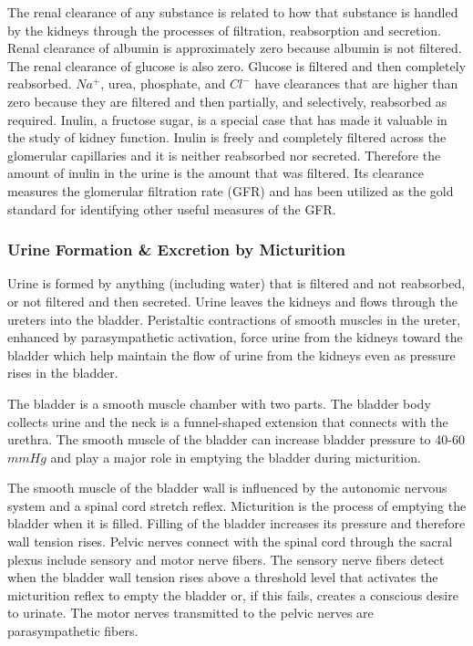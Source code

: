 The renal clearance of any substance is related to how that substance is handled by the kidneys through the processes of filtration, reabsorption and secretion. Renal clearance of albumin is approximately zero because albumin is not filtered. The renal clearance of glucose is also zero. Glucose is filtered and then completely reabsorbed. $Na^+$, urea, phosphate, and $Cl^-$ have clearances that are higher than zero because they are filtered and then partially, and selectively, reabsorbed as required. Inulin, a fructose sugar, is a special case that has made it valuable in the study of kidney function. Inulin is freely and completely filtered across the glomerular capillaries and it is neither reabsorbed nor secreted. Therefore the amount of inulin in the urine is the amount that was filtered. Its clearance measures the glomerular filtration rate (GFR) and has been utilized as the gold standard for identifying other useful measures of the GFR.

\subsubsection{Urine Formation \& Excretion by Micturition}

Urine is formed by anything (including water) that is filtered and not reabsorbed, or not filtered and then secreted. Urine leaves the kidneys and flows through the ureters into the bladder. Peristaltic contractions of smooth muscles in the ureter, enhanced by parasympathetic activation, force urine from the kidneys toward the bladder which help maintain the flow of urine from the kidneys even as pressure rises in the bladder. 

The bladder is a smooth muscle chamber with two parts. The bladder body collects urine and the neck is a funnel-shaped extension that connects with the urethra. The smooth muscle of the bladder can increase bladder pressure to 40-60 $mm Hg$ and play a major role in emptying the bladder during micturition.

The smooth muscle of the bladder wall is influenced by the autonomic nervous system and a spinal cord stretch reflex. Micturition is the process of emptying the bladder when it is filled. Filling of the bladder increases its pressure and therefore wall tension rises. Pelvic nerves connect with the spinal cord through the sacral plexus include sensory and motor nerve fibers. The sensory nerve fibers detect when the bladder wall tension rises above a threshold level that activates the micturition reflex to empty the bladder or, if this fails, creates a conscious desire to urinate. The motor nerves transmitted to the pelvic nerves are parasympathetic fibers.


